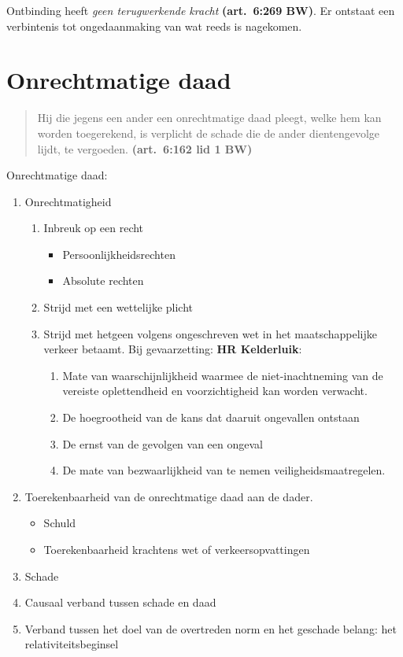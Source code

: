 \documentclass[a4paper]{article}
\newcommand{\art}[1]{\textbf{(art.~#1 BW)}\xspace}
\begin{document}
Ontbinding heeft \emph{geen terugwerkende kracht} \art{6:269}. Er ontstaat een
verbintenis tot ongedaanmaking van wat reeds is nagekomen.

\section{Onrechtmatige daad}

\begin{quote}

  Hij die jegens een ander een onrechtmatige daad pleegt, welke hem kan worden
  toegerekend, is verplicht de schade die de ander dientengevolge lijdt, te
  vergoeden. \art{6:162 lid 1}

\end{quote}

Onrechtmatige daad:
\begin{enumerate}
  \item Onrechtmatigheid
    \begin{enumerate}
      \item Inbreuk op een recht
        \begin{itemize}
          \item Persoonlijkheidsrechten
          \item Absolute rechten
        \end{itemize}
      \item Strijd met een wettelijke plicht
      \item Strijd met hetgeen volgens ongeschreven wet in het
        maatschappelijke verkeer betaamt. Bij gevaarzetting:
        \textbf{HR Kelderluik}:
        \begin{enumerate} \label{list:kelderluik}
          \item Mate van waarschijnlijkheid waarmee de niet-inachtneming van
            de vereiste oplettendheid en voorzichtigheid kan worden verwacht.
          \item De hoegrootheid van de kans dat daaruit ongevallen ontstaan
          \item De ernst van de gevolgen van een ongeval
          \item De mate van bezwaarlijkheid van te nemen
            veiligheidsmaatregelen.
        \end{enumerate}
    \end{enumerate}
  \item Toerekenbaarheid van de onrechtmatige daad aan de dader.
    \begin{itemize}
      \item Schuld
      \item Toerekenbaarheid krachtens wet of verkeersopvattingen
    \end{itemize}
  \item Schade
  \item Causaal verband tussen schade en daad
  \item Verband tussen het doel van de overtreden norm en het geschade belang:
    het relativiteitsbeginsel
\end{enumerate}
\end{document}
